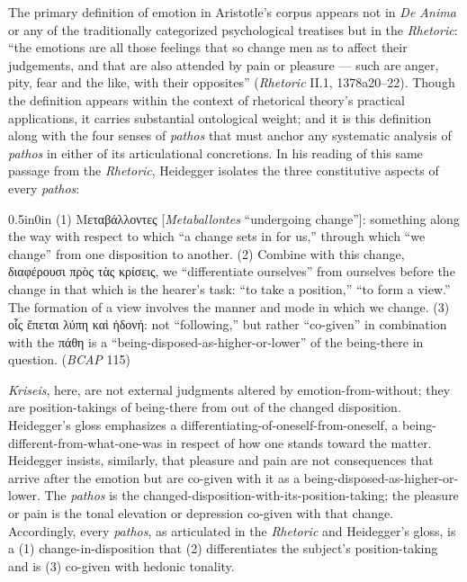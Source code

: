 \documentclass{article}
\newcommand{\gk}[1]{{\greekfont #1}}
\begin{document}
The primary definition of emotion in Aristotle's corpus appears not in \textit{De Anima} or any of the traditionally categorized psychological treatises but in the \textit{Rhetoric}: ``the emotions are all those feelings that so change men as to affect their judgements, and that are also attended by pain or pleasure --- such are anger, pity, fear and the like, with their opposites'' (\textit{Rhetoric} II.1, 1378a20--22). Though the definition appears within the context of rhetorical theory's practical applications, it carries substantial ontological weight; and it is this definition along with the four senses of \textit{pathos} that must anchor any systematic analysis of \textit{pathos} in either of its articulational concretions. In his reading of this same passage from the \textit{Rhetoric}, Heidegger isolates the three constitutive aspects of every \textit{pathos}:
\begin{adjustwidth}{0.5in}{0in}
(1) \gk{Μεταβάλλοντες} [\textit{Metaballontes} ``undergoing change'']: something along the way with respect to which ``a change sets in for us,'' through which ``we change'' from one disposition to another. (2) Combine with this change, \gk{διαφέρουσι πρὸς τὰς κρίσεις}, we ``differentiate ourselves'' from ourselves before the change in that which is the hearer's task: ``to take a position,'' ``to form a view.'' The formation of a view involves the manner and mode in which we change. (3) \gk{οἷς ἕπεται λύπη καὶ ἡδονή}: not ``following,'' but rather ``co-given'' in combination with the \gk{πάθη} is a ``being-disposed-as-higher-or-lower'' of the being-there in question. (\textit{BCAP} 115)
\end{adjustwidth}
\textit{Kriseis}, here, are not external judgments altered by emotion-from-without; they are position-takings of being-there from out of the changed disposition. Heidegger's gloss emphasizes a differentiating-of-oneself-from-oneself, a being-different-from-what-one-was in respect of how one stands toward the matter. Heidegger insists, similarly, that pleasure and pain are not consequences that arrive after the emotion but are co-given with it as a being-disposed-as-higher-or-lower. The \textit{pathos} is the changed-disposition-with-its-position-taking; the pleasure or pain is the tonal elevation or depression co-given with that change. Accordingly, every \textit{pathos}, as articulated in the \textit{Rhetoric} and Heidegger's gloss, is a (1) change-in-disposition that (2) differentiates the subject's position-taking and is (3) co-given with hedonic tonality.
\end{document}
